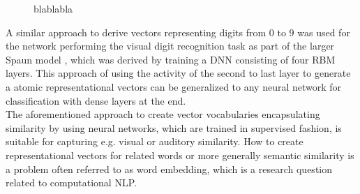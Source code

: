\begin{figure}[t]
	\centering
	\caption{blablabla}
	\label{fig:cnn_arch}
\end{figure}
A similar approach to derive vectors representing digits from $0$ to $9$ was used for the network performing the visual digit recognition task as part of the larger \ac{Spaun} model \cite{Eliasmith2012}, which was derived by training a \ac{DNN} consisting of four \acl{RBM} layers.
This approach of using the activity of the second to last layer to generate a atomic representational vectors can be generalized to any neural network for classification with dense layers at the end.\\
The aforementioned approach to create vector vocabularies encapsulating similarity by using neural networks, which are trained in supervised fashion, is suitable for capturing e.g. visual or auditory similarity.
How to create representational vectors for related words or more generally semantic similarity is a problem often referred to as word embedding, which is a research question related to computational \acl{NLP}.
